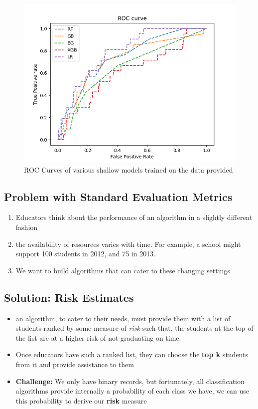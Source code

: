 \documentclass{article}
\begin{document}
\begin{figure}[H]
\centering
\includegraphics[scale=0.5]{plots/toydata/roccurves.png}
\caption{ROC Curves of various shallow models trained on the data provided}
\label{Fig:roccurves}
\end{figure}

\subsection{Problem with Standard Evaluation Metrics}
\begin{enumerate}
\item Educators think about the performance of an algorithm in a slightly different fashion
\item the availability of resources varies with time. For example, a school might support 100 students in 2012, and 75 in 2013. 
\item We want to build algorithms that can cater to these changing settings
\end{enumerate}

\subsection{Solution: Risk Estimates}
\begin{itemize}
\item an algorithm, to cater to their needs, must provide them with a list of students ranked by some measure of \textit{risk} such that, the students at the top of the list are at a higher risk of not graduating on time.

\item Once educators have such a ranked list, they can choose the \textbf{top k} students from it and provide assistance to them

\item \textbf{Challenge:} We only have binary records, but fortunately, all classification algorithms provide internally a probability of each class we have, we can use this probability to derive our \textbf{risk} measure
\end{itemize}
\end{document}
